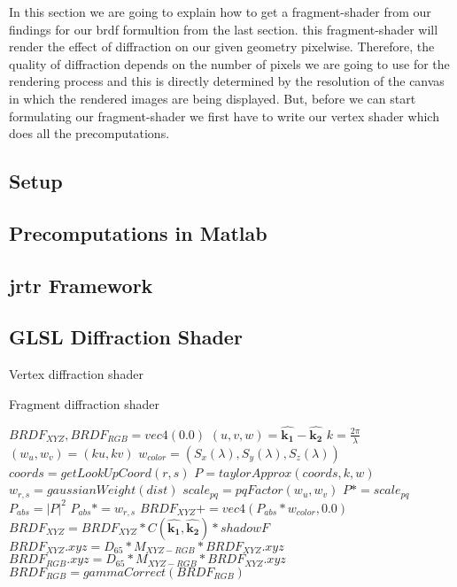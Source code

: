 In this section we are going to explain how to get a fragment-shader from our findings for our brdf formultion from the last section.  this fragment-shader will render the effect of diffraction on our given geometry pixelwise. Therefore, the quality of diffraction depends on the number of pixels we are going to use for the rendering process and this is directly determined by the resolution of the canvas in which the rendered images are being displayed. 
But, before we can start formulating our fragment-shader we first have to write our vertex shader which does all the precomputations. 
 




\subsection{Setup}
\subsection{Precomputations in Matlab}
\subsection{jrtr Framework}
\subsection{GLSL Diffraction Shader}


\begin{algorithm}
  \caption{Vertex diffraction shader}
  \begin{algorithmic}
    \EndFor
  \end{algorithmic}
\end{algorithm}

\begin{algorithm}
  \caption{Fragment diffraction shader}
  \begin{algorithmic}
      \State $BRDF_{XYZ}, BRDF_{RGB} = vec4(0.0)$
      \State $(u,v,w) = \hat{\mathbf{k_1}}-\hat{\mathbf{k_2}}$
        \State $k = \frac{2\pi}{\lambda}$
        \State $(w_u, w_v) = (ku, kv)$
        \State $w_{color} = (S_x(\lambda), S_y(\lambda), S_z(\lambda))$
            \State $coords = getLookUpCoord(r, s)$
            \State $P = taylorApprox(coords, k, w)$
            \State $w_{r,s} = gaussianWeight(dist)$
            \State $scale_{pq} = pqFactor(w_u, w_v)$
            \State $P *= scale_{pq}$
            \State $P_{abs} = \left|P\right|^2$
            \State $P_{abs} *= w_{r,s}$
            \State $BRDF_{XYZ} += vec4(P_{abs}*w_{color}, 0.0)$
          \EndFor
        \EndFor
      \EndFor
      \State $BRDF_{XYZ} = BRDF_{XYZ}*C(\hat{\mathbf{k_1}},\hat{\mathbf{k_2}})*shadowF$
      \State $BRDF_{XYZ}.xyz = D_{65}*M_{XYZ-RGB}*BRDF_{XYZ}.xyz$
      \State $BRDF_{RGB}.xyz = D_{65}*M_{XYZ-RGB}*BRDF_{XYZ}.xyz$
      \State $BRDF_{RGB}= gammaCorrect(BRDF_{RGB})$
    \EndFor
  \end{algorithmic}
\end{algorithm}